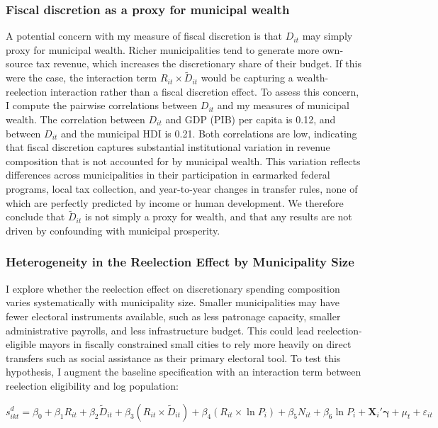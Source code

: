 \documentclass[12pt, a4paper]{article}
\begin{document}
\subsubsection*{Fiscal discretion as a proxy for municipal wealth}

A potential concern with my measure of fiscal discretion is that $D_{it}$ may simply proxy for municipal wealth. Richer municipalities tend to generate more own-source tax revenue, which increases the discretionary share of their budget. If this were the case, the interaction term $R_{it} \times \tilde{D}_{it}$ would be capturing a wealth-reelection interaction rather than a fiscal discretion effect. To assess this concern, I compute the pairwise correlations between $D_{it}$ and my measures of municipal wealth. The correlation between $D_{it}$ and GDP (PIB) per capita is 0.12, and between $D_{it}$ and the municipal HDI is 0.21. Both correlations are low, indicating that fiscal discretion captures substantial institutional variation in revenue composition that is not accounted for by municipal wealth. This variation reflects differences across municipalities in their participation in earmarked federal programs, local tax collection, and year-to-year changes in transfer rules, none of which are perfectly predicted by income or human development. We therefore conclude that $\tilde{D}_{it}$ is not simply a proxy for wealth, and that any results are not driven by confounding with municipal prosperity.

\subsubsection*{Heterogeneity in the Reelection Effect by Municipality Size}

I explore whether the reelection effect on discretionary spending composition varies systematically with municipality size. Smaller municipalities may have fewer electoral instruments available, such as less patronage capacity, smaller administrative payrolls, and less infrastructure budget. This could lead reelection-eligible mayors in fiscally constrained small cities to rely more heavily on direct transfers such as social assistance as their primary electoral tool. To test this hypothesis, I augment the baseline specification with an interaction term between reelection eligibility and log population:

\begin{equation}
    s^{d}_{ikt} = \beta_0
                + \beta_1 R_{it}
                + \beta_2 \tilde{D}_{it}
                + \beta_3 (R_{it} \times \tilde{D}_{it})
                + \beta_4 (R_{it} \times \ln P_i)
                + \beta_5 N_{it}
                + \beta_6 \ln P_i
                + \mathbf{X}_i'\boldsymbol{\gamma}
                + \mu_t
                + \varepsilon_{it}
\end{equation}
\end{document}
